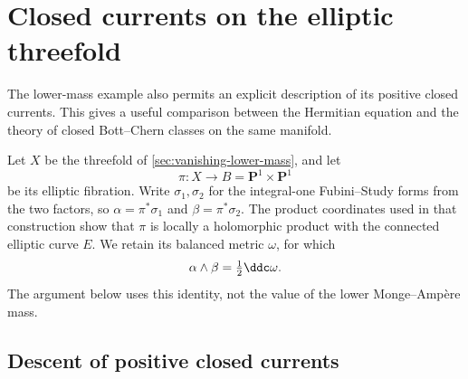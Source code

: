 \section{Closed currents on the elliptic threefold}
\label{sec:elliptic-closed-current-descent}

The lower-mass example also permits an explicit description of its positive closed currents. This gives a useful comparison between the Hermitian equation and the theory of closed Bott--Chern classes on the same manifold.

Let $X$ be the threefold of \cref{sec:vanishing-lower-mass}, and let
\[
 \pi:X\longrightarrow B=\mathbf P^1\times\mathbf P^1
\]
be its elliptic fibration. Write $\sigma_1,\sigma_2$ for the integral-one Fubini--Study forms from the two factors, so $\alpha=\pi^*\sigma_1$ and $\beta=\pi^*\sigma_2$. The product coordinates used in that construction show that $\pi$ is locally a holomorphic product with the connected elliptic curve $E$. We retain its balanced metric $\omega$, for which
\[
 \alpha\wedge\beta=\tfrac12\ddc\omega.
\]
The argument below uses this identity, not the value of the lower Monge--Amp\`ere mass.

\subsection{Descent of positive closed currents}

